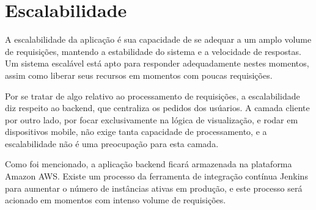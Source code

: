 \section{Escalabilidade}

A escalabilidade da aplicação é sua capacidade de se adequar a um
amplo volume de requisições, mantendo a estabilidade do sistema e a
velocidade de respostas. Um sistema escalável está apto para responder
adequadamente nestes momentos, assim como liberar seus recursos em
momentos com poucas requisições.

Por se tratar de algo relativo ao processamento de requisições, a
escalabilidade diz respeito ao \gls{backend}, que centraliza os
pedidos dos usúarios. A camada cliente por outro lado, por focar
exclusivamente na lógica de visualização, e rodar em dispositivos
mobile, não exige tanta capacidade de processamento, e a
escalabilidade não é uma preocupação para esta camada.

Como foi mencionado, a aplicação \gls{backend} ficará armazenada na
plataforma Amazon AWS. Existe um processo da ferramenta de integração
contínua Jenkins para aumentar o número de instâncias ativas em
produção, e este processo será acionado em momentos com intenso volume
de requisições.



